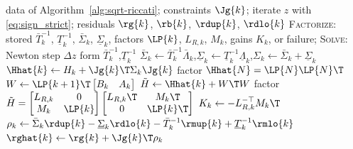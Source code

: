 \begin{algorithm}[H]
\caption{KKT solver --- factorization and solve}
\label{alg:kkt-solver}
\begin{algorithmic}[1]
\Require data of Algorithm~\ref{alg:sqrt-riccati}; constraints $\Jg{k}$; iterate $z$ with \eqref{eq:sign_strict}; residuals $\rg{k}$, $\rb{k}$, $\rdup{k}$, $\rdlo{k}$
\Ensure \textsc{Factorize}: stored $\bar{T}_k^{-1}$, $\underline{T}_k^{-1}$, $\bar{\Sigma}_k$, $\underline{\Sigma}_k$, factors $\LP{k}$, $L_{R,k}$, $M_k$, gains $K_k$, or failure; \textsc{Solve}: Newton step $\Delta z$
\State form $\bar{T}_k^{-1}$,\quad $\underline{T}_k^{-1}$
\State $\bar{\Sigma}_k \gets \bar{T}_k^{-1}\bar{\Lambda}_k$,\quad $\underline{\Sigma}_k \gets \underline{T}_k^{-1}\underline{\Lambda}_k$,\quad $\Sigma_k \gets \bar{\Sigma}_k + \underline{\Sigma}_k$
\State $\Hhat{k} \gets H_k + \Jg{k}\T \Sigma_k \Jg{k}$
\EndFor
\State factor $\Hhat{N} = \LP{N} \LP{N}\T$
\State $W \gets \LP{k+1}\T \begin{bmatrix} B_k & A_k \end{bmatrix}$
\State $\tilde{H} \gets \Hhat{k} + W\T W$
\State factor $\tilde{H} =
\begin{bmatrix} L_{R,k} & 0 \\ M_k & \LP{k} \end{bmatrix}
\begin{bmatrix} L_{R,k}\T & M_k\T \\ 0 & \LP{k}\T \end{bmatrix}$
\State $K_k \gets -L_{R,k}^{-\top} M_k\T$
\EndFor
\EndProcedure
{}
\State $\rho_k \gets \bar{\Sigma}_k \rdup{k} - \underline{\Sigma}_k \rdlo{k} - \bar{T}_k^{-1} \rmup{k} + \underline{T}_k^{-1} \rmlo{k}$
\State $\rghat{k} \gets \rg{k} + \Jg{k}\T \rho_k$

\end{algorithmic}
\end{algorithm}
